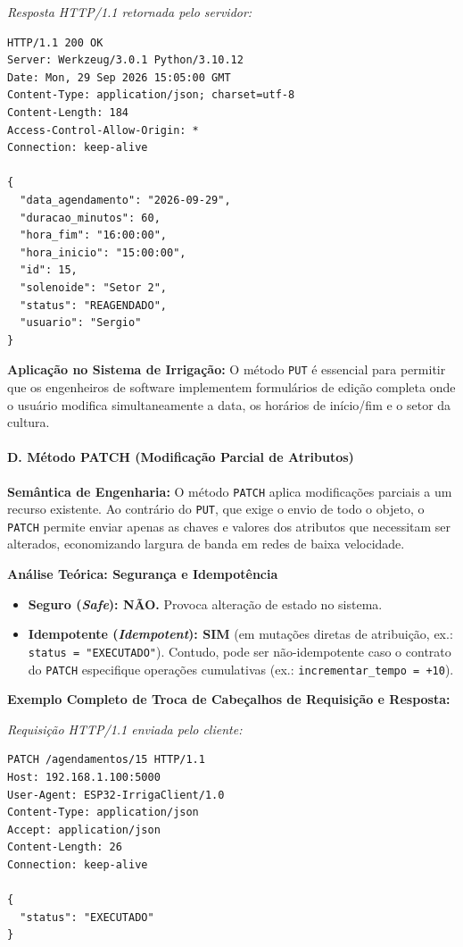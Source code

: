 \textit{Resposta HTTP/1.1 retornada pelo servidor:}
\begin{lstlisting}
HTTP/1.1 200 OK
Server: Werkzeug/3.0.1 Python/3.10.12
Date: Mon, 29 Sep 2026 15:05:00 GMT
Content-Type: application/json; charset=utf-8
Content-Length: 184
Access-Control-Allow-Origin: *
Connection: keep-alive

{
  "data_agendamento": "2026-09-29",
  "duracao_minutos": 60,
  "hora_fim": "16:00:00",
  "hora_inicio": "15:00:00",
  "id": 15,
  "solenoide": "Setor 2",
  "status": "REAGENDADO",
  "usuario": "Sergio"
}
\end{lstlisting}

\textbf{Aplicação no Sistema de Irrigação:} O método \texttt{PUT} é essencial para permitir que os engenheiros de software implementem formulários de edição completa onde o usuário modifica simultaneamente a data, os horários de início/fim e o setor da cultura.

\paragraph*{D. Método PATCH (Modificação Parcial de Atributos)}

\textbf{Semântica de Engenharia:} O método \texttt{PATCH} aplica modificações parciais a um recurso existente. Ao contrário do \texttt{PUT}, que exige o envio de todo o objeto, o \texttt{PATCH} permite enviar apenas as chaves e valores dos atributos que necessitam ser alterados, economizando largura de banda em redes de baixa velocidade.

\textbf{Análise Teórica: Segurança e Idempotência}
\begin{itemize}
    \item \textbf{Seguro (\textit{Safe}): NÃO.} Provoca alteração de estado no sistema.
    \item \textbf{Idempotente (\textit{Idempotent}): SIM} (em mutações diretas de atribuição, ex.: \texttt{status = "EXECUTADO"}). Contudo, pode ser não-idempotente caso o contrato do \texttt{PATCH} especifique operações cumulativas (ex.: \texttt{incrementar\_tempo = +10}).
\end{itemize}

\textbf{Exemplo Completo de Troca de Cabeçalhos de Requisição e Resposta:}

\textit{Requisição HTTP/1.1 enviada pelo cliente:}
\begin{lstlisting}
PATCH /agendamentos/15 HTTP/1.1
Host: 192.168.1.100:5000
User-Agent: ESP32-IrrigaClient/1.0
Content-Type: application/json
Accept: application/json
Content-Length: 26
Connection: keep-alive

{
  "status": "EXECUTADO"
}
\end{lstlisting}

